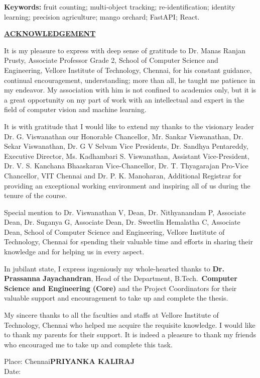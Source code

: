 \documentclass[12pt,a4paper]{report}
\newcommand{\add}[1]{#1}
\newcommand{\fronthead}[1]{%
  \begin{center}\underline{\textbf{\fontsize{14}{17}\selectfont #1}}\end{center}\vspace{6pt}}
\newcommand{\candthreename}{PRIYANKA KALIRAJ}
\newcommand{\guidename}{Dr. Manas Ranjan Prusty}
\newcommand{\guidedesig}{Associate Professor Grade 2}
\newcommand{\hodname}{Dr. Prassanna Jayachandran}
\newcommand{\specname}{Core}
\begin{document}
\vspace{6pt}
\noindent\textbf{Keywords:} \add{fruit counting; multi-object tracking; re-identification; identity learning; precision agriculture; mango orchard; FastAPI; React.}

\clearpage
\fronthead{ACKNOWLEDGEMENT}
It is my pleasure to express with deep sense of gratitude to \guidename, \guidedesig, School of Computer Science and Engineering, Vellore Institute of Technology, Chennai, for his constant guidance, continual encouragement, understanding; more than all, he taught me patience in my endeavor. My association with him is not confined to academics only, but it is a great opportunity on my part of work with an intellectual and expert in the field of \add{computer vision and machine learning}.

It is with gratitude that I would like to extend my thanks to the visionary leader Dr. G. Viswanathan our Honorable Chancellor, Mr. Sankar Viswanathan, Dr. Sekar Viswanathan, Dr. G V Selvam Vice Presidents, Dr. Sandhya Pentareddy, Executive Director, Ms. Kadhambari S. Viswanathan, Assistant Vice-President, Dr. V. S. Kanchana Bhaaskaran Vice-Chancellor, Dr. T. Thyagarajan Pro-Vice Chancellor, VIT Chennai and Dr. P. K. Manoharan, Additional Registrar for providing an exceptional working environment and inspiring all of us during the tenure of the course.

Special mention to Dr. Viswanathan V, Dean, Dr. Nithyanandam P, Associate Dean, Dr. Suganya G, Associate Dean, Dr. Sweetlin Hemalatha C, Associate Dean, School of Computer Science and Engineering, Vellore Institute of Technology, Chennai for spending their valuable time and efforts in sharing their knowledge and for helping us in every aspect.

In jubilant state, I express ingeniously my whole-hearted thanks to \textbf{\hodname}, Head of the Department, B.Tech.\ \textbf{Computer Science and Engineering (\specname)} and the Project Coordinators for their valuable support and encouragement to take up and complete the thesis.

My sincere thanks to all the faculties and staffs at Vellore Institute of Technology, Chennai who helped me acquire the requisite knowledge. I would like to thank my parents for their support. It is indeed a pleasure to thank my friends who encouraged me to take up and complete this task.

\vspace{18pt}
\noindent Place: Chennai\hfill\textbf{\candthreename}\\
Date:
\end{document}
